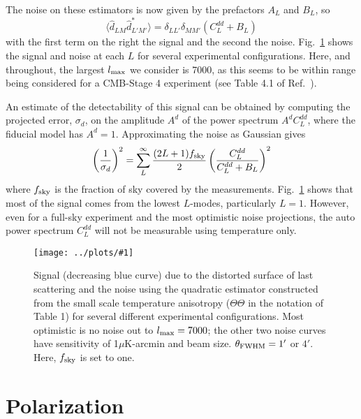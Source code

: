 \documentclass[prd,amsmath,amssymb,floatfix,superscriptaddress,nofootinbib,twocolumn]{revtex4-1}
\def\be{\begin{equation}}
\def\ee{\end{equation}}
\newcommand{\eql}[1]{\label{eq:#1}}
\newcommand{\sfig}[2]{
\texttt{[image: ../plots/\#1]}
        }
\newcommand{\Sfig}[2]{
   \begin{figure}[thbp]
   \begin{center}
    \sfig{#1.pdf}{\columnwidth}
    \caption{{\small #2}}
    \label{fig:#1}
     \end{center}
   \end{figure}
}
\newcommand{\rf}[1]{\ref{fig:#1}}
\newcommand{\scott}[1]{{\color{darkgreen} #1}}
\begin{document}
The noise on these estimators is now given by the prefactors $A_L$ and $B_L$, so  
\be
\langle \hat d_{LM} \hat d^*_{L'M'}  \rangle = \delta_{LL'}\delta_{MM'} \left( C_L^{dd} + B_L \right)
\ee
with the first term on the right the signal and the second the noise. Fig.~\rf{Delay} shows the signal and noise at each $ L$ for several experimental configurations. Here, and throughout, the largest $l_{\rm max}$ we consider is 7000, as this seems to be within range being considered for a CMB-Stage 4 experiment (see Table 4.1 of Ref.~\cite{Abazajian:2016yjj}).

An estimate of the detectability of this signal can be obtained by computing the projected error, $\sigma_d$, on the amplitude $A^d$ of the power spectrum $A^dC_L^{dd}$, where the fiducial model has $A^d=1$.  Approximating the noise as Gaussian gives
\be
\left(\frac{1}{\sigma_d}\right)^2 = \sum_L^{\infty} \frac{(2L+1)f_{\rm sky}}{2} \left(\frac{C_L^{dd}}{C_L^{dd}+B_L}\right)^2\eql{sn}
\ee
where $f_{\rm sky}$ is the fraction of sky covered by the measurements.
Fig.~\rf{Delay} shows that most of the signal comes from the lowest $L$-modes, particularly $L=1$. However, even for a full-sky experiment and the most optimistic noise projections, the
auto power spectrum $C_L^{dd}$ will not be measurable using temperature only.%



\Sfig{Delay}{Signal (decreasing blue curve) due to the distorted surface of last scattering and the noise using the quadratic estimator constructed from the small scale temperature anisotropy ($\Theta\Theta$ in the notation of Table 1) for several different experimental configurations. Most optimistic is no noise out to $l_{\rm max}=7000$; the other two noise curves have sensitivity of 1$\mu$K-arcmin and beam size. %
$\theta_{\rm FWHM}=1'$ or $4'$. Here, $f_{\rm sky}$ is set to one.} 



\section{Polarization}
\end{document}
